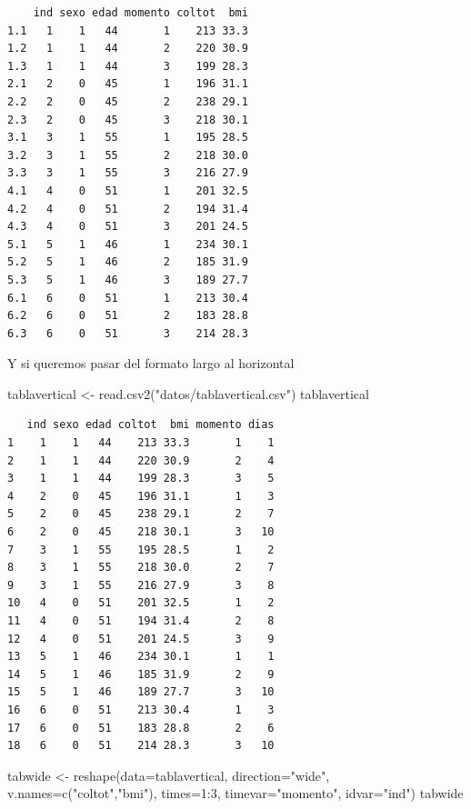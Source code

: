 \documentclass[
]{book}
\newenvironment{Shaded}{\begin{snugshade}}{\end{snugshade}}
\newcommand{\AttributeTok}[1]{\textcolor[rgb]{0.77,0.63,0.00}{#1}}
\newcommand{\DecValTok}[1]{\textcolor[rgb]{0.00,0.00,0.81}{#1}}
\newcommand{\FunctionTok}[1]{\textcolor[rgb]{0.00,0.00,0.00}{#1}}
\newcommand{\NormalTok}[1]{#1}
\newcommand{\OtherTok}[1]{\textcolor[rgb]{0.56,0.35,0.01}{#1}}
\newcommand{\SpecialCharTok}[1]{\textcolor[rgb]{0.00,0.00,0.00}{#1}}
\newcommand{\StringTok}[1]{\textcolor[rgb]{0.31,0.60,0.02}{#1}}
\begin{document}
\begin{verbatim}
    ind sexo edad momento coltot  bmi
1.1   1    1   44       1    213 33.3
1.2   1    1   44       2    220 30.9
1.3   1    1   44       3    199 28.3
2.1   2    0   45       1    196 31.1
2.2   2    0   45       2    238 29.1
2.3   2    0   45       3    218 30.1
3.1   3    1   55       1    195 28.5
3.2   3    1   55       2    218 30.0
3.3   3    1   55       3    216 27.9
4.1   4    0   51       1    201 32.5
4.2   4    0   51       2    194 31.4
4.3   4    0   51       3    201 24.5
5.1   5    1   46       1    234 30.1
5.2   5    1   46       2    185 31.9
5.3   5    1   46       3    189 27.7
6.1   6    0   51       1    213 30.4
6.2   6    0   51       2    183 28.8
6.3   6    0   51       3    214 28.3
\end{verbatim}

Y si queremos pasar del formato largo al horizontal

\begin{Shaded}
\begin{Highlighting}[]
\NormalTok{tablavertical }\OtherTok{\textless{}{-}} \FunctionTok{read.csv2}\NormalTok{(}\StringTok{"datos/tablavertical.csv"}\NormalTok{)}
\NormalTok{tablavertical}
\end{Highlighting}
\end{Shaded}

\begin{verbatim}
   ind sexo edad coltot  bmi momento dias
1    1    1   44    213 33.3       1    1
2    1    1   44    220 30.9       2    4
3    1    1   44    199 28.3       3    5
4    2    0   45    196 31.1       1    3
5    2    0   45    238 29.1       2    7
6    2    0   45    218 30.1       3   10
7    3    1   55    195 28.5       1    2
8    3    1   55    218 30.0       2    7
9    3    1   55    216 27.9       3    8
10   4    0   51    201 32.5       1    2
11   4    0   51    194 31.4       2    8
12   4    0   51    201 24.5       3    9
13   5    1   46    234 30.1       1    1
14   5    1   46    185 31.9       2    9
15   5    1   46    189 27.7       3   10
16   6    0   51    213 30.4       1    3
17   6    0   51    183 28.8       2    6
18   6    0   51    214 28.3       3   10
\end{verbatim}

\begin{Shaded}
\begin{Highlighting}[]
\NormalTok{tabwide }\OtherTok{\textless{}{-}} \FunctionTok{reshape}\NormalTok{(}\AttributeTok{data=}\NormalTok{tablavertical, }
                   \AttributeTok{direction=}\StringTok{"wide"}\NormalTok{, }
                   \AttributeTok{v.names=}\FunctionTok{c}\NormalTok{(}\StringTok{"coltot"}\NormalTok{,}\StringTok{"bmi"}\NormalTok{), }
                   \AttributeTok{times=}\DecValTok{1}\SpecialCharTok{:}\DecValTok{3}\NormalTok{, }
                   \AttributeTok{timevar=}\StringTok{"momento"}\NormalTok{, }
                   \AttributeTok{idvar=}\StringTok{"ind"}\NormalTok{)}
\NormalTok{tabwide}
\end{Highlighting}
\end{Shaded}
\end{document}
